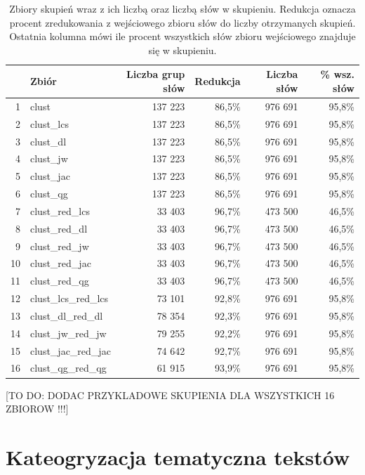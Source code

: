 \documentclass{praca1}
\begin{document}
\begin{table}[!h]
\centering
\caption{Zbiory skupień wraz z ich liczbą oraz liczbą słów w skupieniu. Redukcja oznacza procent zredukowania z wejściowego zbioru słów do liczby otrzymanych skupień. Ostatnia kolumna mówi ile procent wszystkich słów zbioru wejściowego znajduje się w skupieniu.}
\begin{tabular}{|rl|rr|rr|}
  \hline
 & Zbiór & Liczba grup słów & Redukcja & Liczba słów & \% wsz. słów \\ 
  \hline
1 & clust & 137 223 & 86,5\% & 976 691 & 95,8\% \\ 
  2 & clust\_lcs & 137 223 & 86,5\% & 976 691 & 95,8\% \\ 
  3 & clust\_dl & 137 223 & 86,5\% & 976 691 & 95,8\% \\ 
  4 & clust\_jw & 137 223 & 86,5\% & 976 691 & 95,8\% \\ 
  5 & clust\_jac & 137 223 & 86,5\% & 976 691 & 95,8\% \\ 
  6 & clust\_qg & 137 223 & 86,5\% & 976 691 & 95,8\% \\ 
   \hline
7 & clust\_red\_lcs & 33 403 & 96,7\% & 473 500 & 46,5\% \\ 
  8 & clust\_red\_dl & 33 403 & 96,7\% & 473 500 & 46,5\% \\ 
  9 & clust\_red\_jw & 33 403 & 96,7\% & 473 500 & 46,5\% \\ 
  10 & clust\_red\_jac & 33 403 & 96,7\% & 473 500 & 46,5\% \\ 
  11 & clust\_red\_qg & 33 403 & 96,7\% & 473 500 & 46,5\% \\ 
   \hline
12 & clust\_lcs\_red\_lcs & 73 101 & 92,8\% & 976 691 & 95,8\% \\ 
  13 & clust\_dl\_red\_dl & 78 354 & 92,3\% & 976 691 & 95,8\% \\ 
  14 & clust\_jw\_red\_jw & 79 255 & 92,2\% & 976 691 & 95,8\% \\ 
  15 & clust\_jac\_red\_jac & 74 642 & 92,7\% & 976 691 & 95,8\% \\ 
  16 & clust\_qg\_red\_qg & 61 915 & 93,9\% & 976 691 & 95,8\% \\ 
   \hline
\end{tabular}
\label{tab:005}
\end{table}

[TO DO: DODAC PRZYKLADOWE SKUPIENIA DLA WSZYSTKICH 16 ZBIOROW !!!] 

\section{Kateogryzacja tematyczna tekstów}
\end{document}
